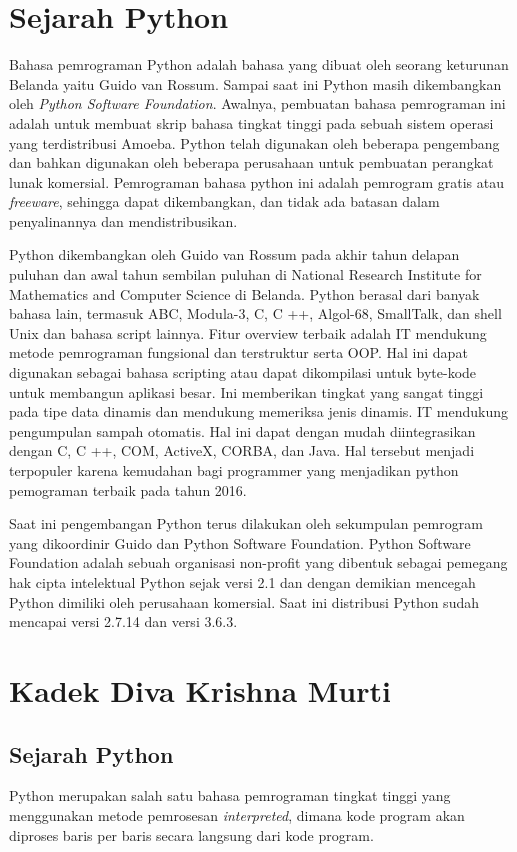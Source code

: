 \section{Sejarah Python}
Bahasa pemrograman Python adalah bahasa yang dibuat oleh seorang keturunan Belanda yaitu Guido van Rossum. Sampai saat ini Python masih dikembangkan oleh \textit{Python Software Foundation}. Awalnya, pembuatan bahasa pemrograman ini adalah untuk membuat skrip bahasa tingkat tinggi pada sebuah sistem operasi yang terdistribusi Amoeba. Python telah digunakan oleh beberapa pengembang dan bahkan digunakan oleh beberapa perusahaan untuk pembuatan perangkat lunak komersial. Pemrograman bahasa python ini adalah pemrogram gratis atau \textit{freeware}, sehingga dapat dikembangkan, dan tidak ada batasan dalam penyalinannya dan mendistribusikan. 

Python dikembangkan oleh Guido van Rossum pada akhir tahun delapan puluhan dan awal tahun sembilan puluhan di National Research Institute for Mathematics and Computer Science di Belanda. Python berasal dari banyak bahasa lain, termasuk ABC, Modula-3, C, C ++, Algol-68, SmallTalk, dan shell Unix dan bahasa script lainnya.
Fitur overview terbaik adalah IT mendukung metode pemrograman fungsional dan terstruktur serta OOP. Hal ini dapat digunakan sebagai bahasa scripting atau dapat dikompilasi untuk byte-kode untuk membangun aplikasi besar. Ini memberikan tingkat yang sangat tinggi pada tipe data dinamis dan mendukung memeriksa jenis dinamis. IT mendukung pengumpulan sampah otomatis. Hal ini dapat dengan mudah diintegrasikan dengan C, C ++, COM, ActiveX, CORBA, dan Java. Hal tersebut menjadi terpopuler karena kemudahan bagi programmer yang menjadikan python pemograman terbaik pada tahun 2016.

Saat ini pengembangan Python terus dilakukan oleh sekumpulan pemrogram yang dikoordinir Guido dan Python Software Foundation. Python Software Foundation adalah sebuah organisasi non-profit yang dibentuk sebagai pemegang hak cipta intelektual Python sejak versi 2.1 dan dengan demikian mencegah Python dimiliki oleh perusahaan komersial. Saat ini distribusi Python sudah mencapai versi 2.7.14 dan versi 3.6.3. 

\section{Kadek Diva Krishna Murti}

\subsection{Sejarah Python}
Python merupakan salah satu bahasa pemrograman tingkat tinggi yang menggunakan metode pemrosesan \textit{interpreted}, dimana kode program akan diproses baris per baris secara langsung dari kode program.

